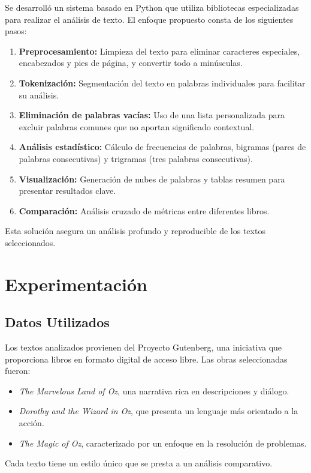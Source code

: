 \documentclass[conference]{IEEEtran}
\begin{document}
Se desarrolló un sistema basado en Python que utiliza bibliotecas especializadas para realizar el análisis de texto. El enfoque propuesto consta de los siguientes pasos:

\begin{enumerate}
    \item \textbf{Preprocesamiento:} Limpieza del texto para eliminar caracteres especiales, encabezados y pies de página, y convertir todo a minúsculas.
    \item \textbf{Tokenización:} Segmentación del texto en palabras individuales para facilitar su análisis.
    \item \textbf{Eliminación de palabras vacías:} Uso de una lista personalizada para excluir palabras comunes que no aportan significado contextual.
    \item \textbf{Análisis estadístico:} Cálculo de frecuencias de palabras, bigramas (pares de palabras consecutivas) y trigramas (tres palabras consecutivas).
    \item \textbf{Visualización:} Generación de nubes de palabras y tablas resumen para presentar resultados clave.
    \item \textbf{Comparación:} Análisis cruzado de métricas entre diferentes libros.
\end{enumerate}

Esta solución asegura un análisis profundo y reproducible de los textos seleccionados.


\section{Experimentación}

\subsection{Datos Utilizados}

Los textos analizados provienen del Proyecto Gutenberg, una iniciativa que proporciona libros en formato digital de acceso libre. Las obras seleccionadas fueron:
\begin{itemize}
    \item \textit{The Marvelous Land of Oz}, una narrativa rica en descripciones y diálogo.
    \item \textit{Dorothy and the Wizard in Oz}, que presenta un lenguaje más orientado a la acción.
    \item \textit{The Magic of Oz}, caracterizado por un enfoque en la resolución de problemas.
\end{itemize}
Cada texto tiene un estilo único que se presta a un análisis comparativo.
\end{document}

